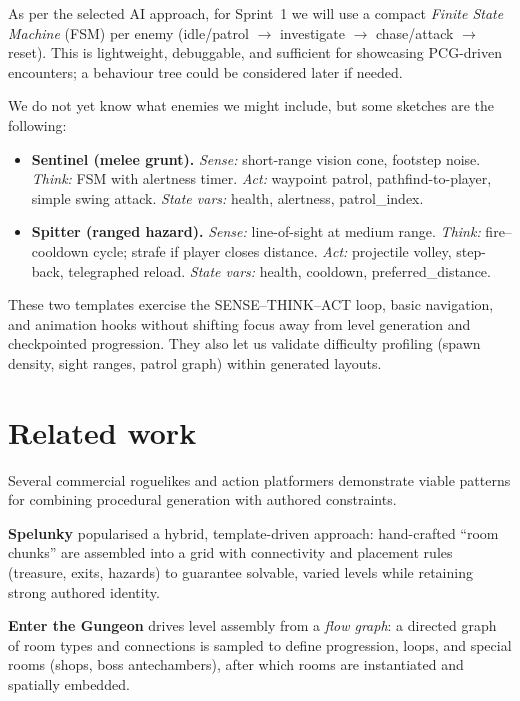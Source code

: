 \documentclass[11pt]{article}
\begin{document}
As per the selected AI approach, for Sprint~1 we will use a compact \emph{Finite State Machine} (FSM) per enemy (idle/patrol $\rightarrow$ investigate $\rightarrow$ chase/attack $\rightarrow$ reset). 
This is lightweight, debuggable, and sufficient for showcasing PCG-driven encounters; a behaviour tree could be considered later if needed.

We do not yet know what enemies we might include, but some sketches are the following:
\begin{itemize}[leftmargin=1.2em,noitemsep]
  \item \textbf{Sentinel (melee grunt).} 
  \emph{Sense:} short-range vision cone, footstep noise. 
  \emph{Think:} FSM with alertness timer. 
  \emph{Act:} waypoint patrol, pathfind-to-player, simple swing attack. 
  \emph{State vars:} health, alertness, patrol\_index.
  \item \textbf{Spitter (ranged hazard).}
  \emph{Sense:} line-of-sight at medium range. 
  \emph{Think:} fire–cooldown cycle; strafe if player closes distance. 
  \emph{Act:} projectile volley, step-back, telegraphed reload. 
  \emph{State vars:} health, cooldown, preferred\_distance.
\end{itemize}

These two templates exercise the SENSE–THINK–ACT loop, basic navigation, and animation hooks without shifting focus away from level generation and checkpointed progression. They also let us validate difficulty profiling (spawn density, sight ranges, patrol graph) within generated layouts. 

\section{Related work}

Several commercial roguelikes and action platformers demonstrate viable patterns for combining procedural generation with authored constraints.

\textbf{Spelunky} popularised a hybrid, template-driven approach: hand-crafted ``room chunks'' are assembled into a grid with connectivity and placement rules (treasure, exits, hazards) to guarantee solvable, varied levels while retaining strong authored identity.

\textbf{Enter the Gungeon} drives level assembly from a \emph{flow graph}: a directed graph of room types and connections is sampled to define progression, loops, and special rooms (shops, boss antechambers), after which rooms are instantiated and spatially embedded.
\end{document}
